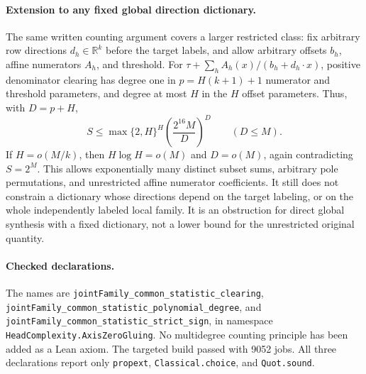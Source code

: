 \documentclass{article}
\begin{document}
\paragraph{Extension to any fixed global direction dictionary.}
The same written counting argument covers a larger restricted class:
fix arbitrary row directions $d_h\in\mathbb R^k$ before the target labels,
and allow arbitrary offsets $b_h$, affine numerators $A_h$, and threshold.
For $\tau+\sum_h A_h(x)/(b_h+d_h\cdot x)$, positive denominator clearing
has degree one in $p=H(k+1)+1$ numerator and threshold parameters, and
degree at most $H$ in the $H$ offset parameters. Thus, with $D=p+H$,
\[
 S\leq \max\{2,H\}^{H}
       \left(\frac{2^{16}M}{D}\right)^D
 \qquad(D\leq M).
\]
If $H=o(M/k)$, then $H\log H=o(M)$ and $D=o(M)$, again contradicting
$S=2^M$. This allows exponentially many distinct subset sums, arbitrary
pole permutations, and unrestricted affine numerator coefficients.
It still does not constrain a dictionary whose directions depend on the
target labeling, or on the whole independently labeled local family.
It is an obstruction for direct global synthesis with a fixed dictionary,
not a lower bound for the unrestricted original quantity.

\paragraph{Checked declarations.}
The names are
\texttt{jointFamily\_common\_statistic\_clearing},
\texttt{jointFamily\_common\_statistic\_polynomial\_degree}, and
\texttt{jointFamily\_common\_statistic\_strict\_sign}, in namespace
\texttt{HeadComplexity.AxisZeroGluing}.
No multidegree counting principle has been added as a Lean axiom.
The targeted build passed with 9052 jobs. All three declarations report
only \texttt{propext}, \texttt{Classical.choice}, and \texttt{Quot.sound}.
\end{document}
